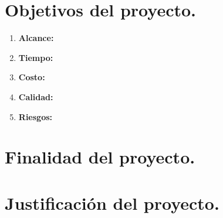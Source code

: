 \chapter*{Objetivos del proyecto.}
%
\begin{enumerate}
	\item \textbf{Alcance:} %
	\item \textbf{Tiempo:} %
	\item \textbf{Costo:} %
	\item \textbf{Calidad:} %
	\item \textbf{Riesgos:} %
\end{enumerate}
%
\chapter*{Finalidad del proyecto.}
%
\chapter*{Justificaci\'on del proyecto.}